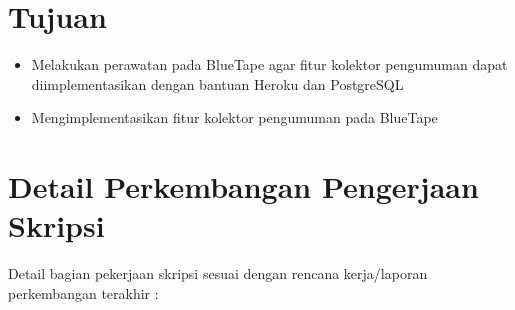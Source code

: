 \documentclass[a4paper,twoside]{article}
\begin{document}
\section{Tujuan}
\begin{itemize}
\item Melakukan perawatan pada BlueTape agar fitur kolektor pengumuman dapat diimplementasikan dengan bantuan Heroku dan PostgreSQL
\item Mengimplementasikan fitur kolektor pengumuman pada BlueTape
\end{itemize}

\section{Detail Perkembangan Pengerjaan Skripsi}
Detail bagian pekerjaan skripsi sesuai dengan rencana kerja/laporan perkembangan terakhir :
\end{document}
